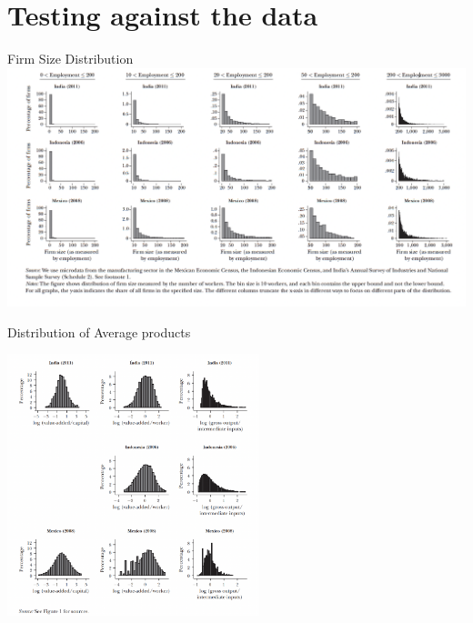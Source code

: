 \documentclass[usenames,dvipsnames,aspectratio=169]{beamer}
\begin{document}
\section{Testing against the data}
\begin{frame}{Firm Size Distribution}
    \includegraphics[width=\textwidth]{Figures/FirmSizeDist.png}
\end{frame}

\begin{frame}{Distribution of Average products}
\begin{center}
    \includegraphics[width=0.55\textwidth]{Figures/ReturnDistribution.png}
\end{center}
\end{frame}
\end{document}
